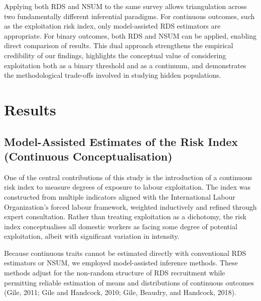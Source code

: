 \documentclass[
  12pt,
  letterpaper,
  DIV=11,
  numbers=noendperiod]{scrartcl}
\theoremstyle{plain}
\theoremstyle{definition}
\begin{document}
Applying both RDS and NSUM to the same survey allows triangulation
across two fundamentally different inferential paradigms. For continuous
outcomes, such as the exploitation risk index, only model-assisted RDS
estimators are appropriate. For binary outcomes, both RDS and NSUM can
be applied, enabling direct comparison of results. This dual approach
strengthens the empirical credibility of our findings, highlights the
conceptual value of considering exploitation both as a binary threshold
and as a continuum, and demonstrates the methodological trade-offs
involved in studying hidden populations.

\section{Results}\label{results}

\subsection{Model-Assisted Estimates of the Risk Index (Continuous
Conceptualisation)}\label{model-assisted-estimates-of-the-risk-index-continuous-conceptualisation}

One of the central contributions of this study is the introduction of a
continuous risk index to measure degrees of exposure to labour
exploitation. The index was constructed from multiple indicators aligned
with the International Labour Organization's forced labour framework,
weighted inductively and refined through expert consultation. Rather
than treating exploitation as a dichotomy, the risk index conceptualises
all domestic workers as facing some degree of potential exploitation,
albeit with significant variation in intensity.

Because continuous traits cannot be estimated directly with conventional
RDS estimators or NSUM, we employed model-assisted inference methods.
These methods adjust for the non-random structure of RDS recruitment
while permitting reliable estimation of means and distributions of
continuous outcomes (Gile, 2011; Gile and Handcock, 2010; Gile, Beaudry,
and Handcock, 2018).
\end{document}

